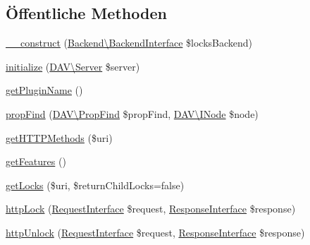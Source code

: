 \subsection*{Öffentliche Methoden}
\begin{DoxyCompactItemize}
\item 
\mbox{\hyperlink{class_sabre_1_1_d_a_v_1_1_locks_1_1_plugin_a29c2fc50079fa2931884a63482eadebd}{\+\_\+\+\_\+construct}} (\mbox{\hyperlink{interface_sabre_1_1_d_a_v_1_1_locks_1_1_backend_1_1_backend_interface}{Backend\textbackslash{}\+Backend\+Interface}} \$locks\+Backend)
\item 
\mbox{\hyperlink{class_sabre_1_1_d_a_v_1_1_locks_1_1_plugin_a9b8e0a4212760126df8f16671f583b6b}{initialize}} (\mbox{\hyperlink{class_sabre_1_1_d_a_v_1_1_server}{D\+A\+V\textbackslash{}\+Server}} \$server)
\item 
\mbox{\hyperlink{class_sabre_1_1_d_a_v_1_1_locks_1_1_plugin_a1dfc87e58dc85f6262562fb026178238}{get\+Plugin\+Name}} ()
\item 
\mbox{\hyperlink{class_sabre_1_1_d_a_v_1_1_locks_1_1_plugin_a8859c5c4f2eae58c6a6285071f6a0e87}{prop\+Find}} (\mbox{\hyperlink{class_sabre_1_1_d_a_v_1_1_prop_find}{D\+A\+V\textbackslash{}\+Prop\+Find}} \$prop\+Find, \mbox{\hyperlink{interface_sabre_1_1_d_a_v_1_1_i_node}{D\+A\+V\textbackslash{}\+I\+Node}} \$node)
\item 
\mbox{\hyperlink{class_sabre_1_1_d_a_v_1_1_locks_1_1_plugin_a7956ed93122098d77311dbdf79b1b90b}{get\+H\+T\+T\+P\+Methods}} (\$uri)
\item 
\mbox{\hyperlink{class_sabre_1_1_d_a_v_1_1_locks_1_1_plugin_a1a1ab5c99088be46817dccc60a4875b6}{get\+Features}} ()
\item 
\mbox{\hyperlink{class_sabre_1_1_d_a_v_1_1_locks_1_1_plugin_aa11d55d64b983c4dc0ee7b1a4b00fbf0}{get\+Locks}} (\$uri, \$return\+Child\+Locks=false)
\item 
\mbox{\hyperlink{class_sabre_1_1_d_a_v_1_1_locks_1_1_plugin_a7d3f1da48a8eb0d4d512b4698b332961}{http\+Lock}} (\mbox{\hyperlink{interface_sabre_1_1_h_t_t_p_1_1_request_interface}{Request\+Interface}} \$request, \mbox{\hyperlink{interface_sabre_1_1_h_t_t_p_1_1_response_interface}{Response\+Interface}} \$response)
\item 
\mbox{\hyperlink{class_sabre_1_1_d_a_v_1_1_locks_1_1_plugin_a655717abccbcd3a907e032a92ca6a57f}{http\+Unlock}} (\mbox{\hyperlink{interface_sabre_1_1_h_t_t_p_1_1_request_interface}{Request\+Interface}} \$request, \mbox{\hyperlink{interface_sabre_1_1_h_t_t_p_1_1_response_interface}{Response\+Interface}} \$response)

\end{DoxyCompactItemize}
